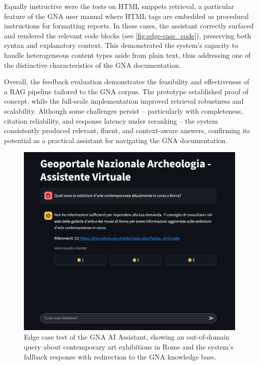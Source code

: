 \begin{spacing}{1.5}
Equally instructive were the tests on HTML snippets retrieval, a particular feature of the GNA user manual where HTML tags are embedded as procedural instructions for formatting reports. In these cases, the assistant correctly surfaced and rendered the relevant code blocks (see \autoref{fig:edge-case_code}), preserving both syntax and explanatory context. This demonstrated the system’s capacity to handle heterogeneous content types aside from plain text, thus addressing one of the distinctive characteristics of the GNA documentation.

Overall, the feedback evaluation demonstrates the feasibility and effectiveness of a RAG pipeline tailored to the GNA corpus. The prototype established proof of concept, while the full-scale implementation improved retrieval robustness and scalability. Although some challenges persist -- particularly with completeness, citation reliability, and response latency under reranking -- the system consistently produced relevant, fluent, and context-aware answers, confirming its potential as a practical assistant for navigating the GNA documentation.

\vspace{0.5em}
\begin{figure}[H]
  \centering
  \includegraphics[width=\textwidth]{images/edge_case_response.png} 
  \caption{Edge case test of the GNA AI Assistant, showing an out-of-domain query about contemporary art exhibitions in Rome and the system’s fallback response with redirection to the GNA knowledge base.}
  \label{fig:edge-case}
\end{figure}


\end{spacing}
